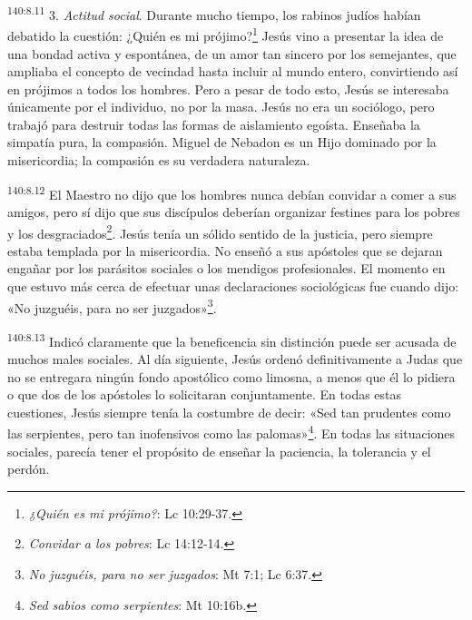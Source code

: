 \par
\textsuperscript{140:8.11} 3. \textit{Actitud social}. Durante mucho tiempo, los rabinos judíos habían debatido la cuestión: ¿Quién es mi prójimo?\footnote{\textit{¿Quién es mi prójimo?}: Lc 10:29-37.} Jesús vino a presentar la idea de una bondad activa y espontánea, de un amor tan sincero por los semejantes, que ampliaba el concepto de vecindad hasta incluir al mundo entero, convirtiendo así en prójimos a todos los hombres. Pero a pesar de todo esto, Jesús se interesaba únicamente por el individuo, no por la masa. Jesús no era un sociólogo, pero trabajó para destruir todas las formas de aislamiento egoísta. Enseñaba la simpatía pura, la compasión. Miguel de Nebadon es un Hijo dominado por la misericordia; la compasión es su verdadera naturaleza.

\par
\textsuperscript{140:8.12} El Maestro no dijo que los hombres nunca debían convidar a comer a sus amigos, pero sí dijo que sus discípulos deberían organizar festines para los pobres y los desgraciados\footnote{\textit{Convidar a los pobres}: Lc 14:12-14.}. Jesús tenía un sólido sentido de la justicia, pero siempre estaba templada por la misericordia. No enseñó a sus apóstoles que se dejaran engañar por los parásitos sociales o los mendigos profesionales. El momento en que estuvo más cerca de efectuar unas declaraciones sociológicas fue cuando dijo: «No juzguéis, para no ser juzgados»\footnote{\textit{No juzguéis, para no ser juzgados}: Mt 7:1; Lc 6:37.}.

\par
\textsuperscript{140:8.13} Indicó claramente que la beneficencia sin distinción puede ser acusada de muchos males sociales. Al día siguiente, Jesús ordenó definitivamente a Judas que no se entregara ningún fondo apostólico como limosna, a menos que él lo pidiera o que dos de los apóstoles lo solicitaran conjuntamente. En todas estas cuestiones, Jesús siempre tenía la costumbre de decir: «Sed tan prudentes como las serpientes, pero tan inofensivos como las palomas»\footnote{\textit{Sed sabios como serpientes}: Mt 10:16b.}. En todas las situaciones sociales, parecía tener el propósito de enseñar la paciencia, la tolerancia y el perdón.

